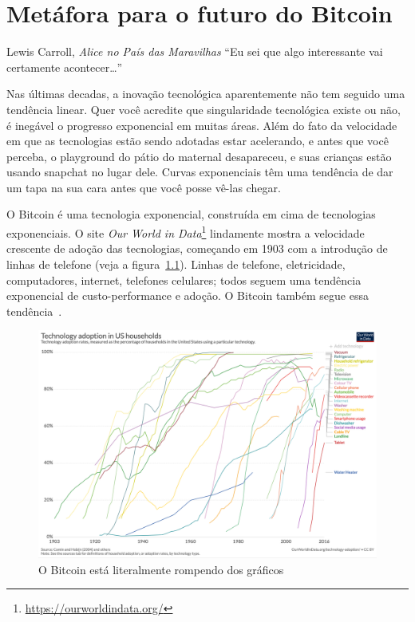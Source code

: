 \chapter{Metáfora para o futuro do Bitcoin}
\label{les:21}

\begin{chapquote}{Lewis Carroll, \textit{Alice no País das Maravilhas}}
\enquote{Eu sei que algo interessante vai certamente acontecer\ldots}
\end{chapquote}

Nas últimas decadas, a inovação tecnológica aparentemente não tem seguido 
uma tendência linear. Quer você acredite que singularidade tecnológica existe 
ou não, é inegável o progresso exponencial em muitas áreas. Além do fato da velocidade 
em que as tecnologias estão sendo adotadas estar acelerando, e antes 
que você perceba, o playground do pátio do maternal desapareceu, e suas 
crianças estão usando snapchat no lugar dele. Curvas exponenciais têm uma 
tendência de dar um tapa na sua cara antes que você posse vê-las chegar.

O Bitcoin é uma tecnologia exponencial, construída em cima de tecnologias exponenciais.
O site \textit{Our World in Data}\footnote{\url{https://ourworldindata.org/}}
lindamente mostra a velocidade crescente de adoção das tecnologias, começando em 1903
com a introdução de linhas de telefone (veja a figura~\ref{fig:tech-adoption}).
Linhas de telefone, eletricidade, computadores, internet, telefones celulares; 
todos seguem uma tendência exponencial de custo-performance e adoção. 
O Bitcoin também segue essa tendência~\cite{tech-adoption}.

\begin{figure}
  \includegraphics{assets/images/tech-adoption.png}
  \caption{O Bitcoin está literalmente rompendo dos gráficos}
  \label{fig:tech-adoption}
\end{figure}

